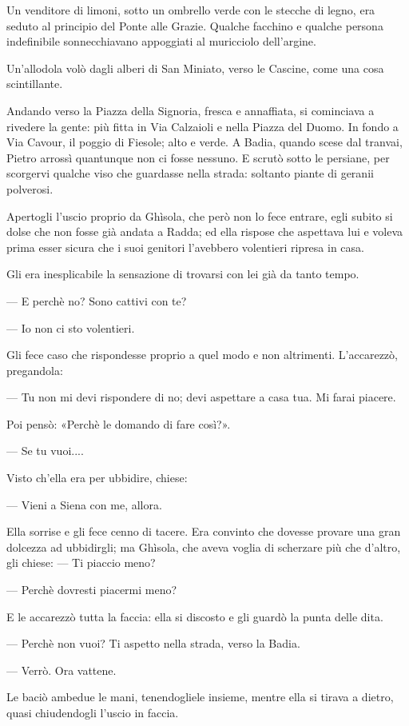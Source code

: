 Un venditore di limoni, sotto un ombrello verde con le stecche di legno, era seduto al principio del Ponte alle Grazie. Qualche facchino e qualche persona indefinibile sonnecchiavano appoggiati al muricciolo dell'argine.

Un'allodola volò dagli alberi di San Miniato, verso le Cascine, come una cosa scintillante.

Andando verso la Piazza della Signoria, fresca e annaffiata, si cominciava a rivedere la gente: più fitta in Via Calzaioli e nella Piazza del Duomo. In fondo a Via Cavour, il poggio di Fiesole; alto e verde. A Badia, quando scese dal tranvai, Pietro arrossì quantunque non ci fosse nessuno. E scrutò sotto le persiane, per scorgervi qualche viso che guardasse nella strada: soltanto piante di geranii polverosi.

Apertogli l'uscio proprio da Ghìsola, che però non lo fece entrare, egli subito si dolse che non fosse già andata a Radda; ed ella rispose che aspettava lui e voleva prima esser sicura che i suoi genitori l'avebbero volentieri ripresa in casa.

Gli era inesplicabile la sensazione di trovarsi con lei già da tanto tempo.

— E perchè no? Sono cattivi con te?

— Io non ci sto volentieri.

Gli fece caso che rispondesse proprio a quel modo e non altrimenti. L'accarezzò, pregandola:

— Tu non mi devi rispondere di no; devi aspettare a casa tua. Mi farai piacere.

Poi pensò: «Perchè le domando di fare così?».

— Se tu vuoi....

Visto ch'ella era per ubbidire, chiese:

— Vieni a Siena con me, allora.

Ella sorrise e gli fece cenno di tacere. Era convinto che dovesse provare una gran dolcezza ad ubbidirgli; ma Ghìsola, che aveva voglia di scherzare più che d'altro, gli chiese: — Ti piaccio meno?

— Perchè dovresti piacermi meno?

E le accarezzò tutta la faccia: ella si discosto e gli guardò la punta delle dita.

— Perchè non vuoi? Ti aspetto nella strada, verso la Badia.

— Verrò. Ora vattene.

Le baciò ambedue le mani, tenendogliele insieme, mentre ella si tirava a dietro, quasi chiudendogli l'uscio in faccia.

